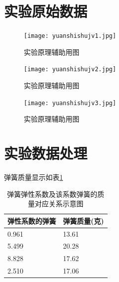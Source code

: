 \documentclass{ctexart}
\begin{document}
  \subsection{}
\newpage



















\section{实验原始数据}
\begin{figure}[h]
  \centering
  \texttt{[image: yuanshishujv1.jpg]}
  \caption{实验原理辅助用图}\label{yuanshishujv1}
\end{figure}
\newpage
\begin{figure}[h]
  \centering
  \texttt{[image: yuanshishujv2.jpg]}
  \caption{实验原理辅助用图}\label{yuanshishujv2}
\end{figure}
\newpage
\begin{figure}[h]
  \centering
  \texttt{[image: yuanshishujv3.jpg]}
  \caption{实验原理辅助用图}\label{yuanshishujv3}
\end{figure}
\newpage

\section{实验数据处理}
弹簧质量显示如表\ref{tanhuangzhiliang}
\begin{table}[h]
  \centering   
  \caption{弹簧弹性系数及该系数弹簧的质量对应关系示意图}\label{tanhuangzhiliang}
  \begin{tabular}{| l || l |}
      \hline
      弹性系数的弹簧 & 弹簧质量(克)\\
      \hline
      0.961 & 13.61 \\
      \hline
      5.499 & 20.28 \\
      \hline
      8.828 & 17.62 \\
      \hline
      2.510 & 17.06 \\
      \hline                       
  \end{tabular}
\end{table}
\end{document}
